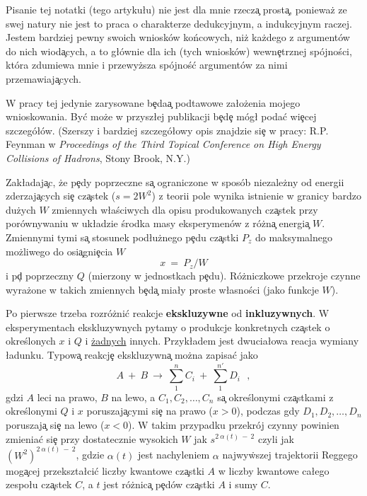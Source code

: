Pisanie tej notatki (tego artyku\l u) nie jest dla mnie rzecz\c{a} prost\c{a}, poniewa\.{z}
ze swej natury nie jest to praca o charakterze dedukcyjnym, a indukcyjnym raczej.
Jestem bardziej pewny swoich wniosk\'{o}w ko\'{n}cowych, ni\.{z} ka\.{z}dego z
argument\'{o}w do nich wiod\c{a}cych, a to g\l \'{o}wnie dla ich (tych wniosk\'{o}w)
wewn\c{e}trznej sp\'{o}jno\'{s}ci, kt\'{o}ra zdumiewa mnie i przewy\.{z}sza
sp\'{o}jno\'{s}\'{c} argument\'{o}w za nimi przemawiaj\c{a}cych.

W pracy tej jedynie zarysowane b\c{e}da\c{a} podtawowe za\l o\.{z}enia mojego
wnioskowania. By\'{c} mo\.{z}e w przysz\l ej publikacji b\c{e}d\c{e} m\'{o}g{\l }
poda\'{c} wi\c{e}cej szczeg\'{o}\l \'{o}w. (Szerszy i bardziej szczeg\'{o}\l owy
opis znajdzie si\c{e} w pracy: R.P. Feynman w {\it Proceedings of the Third
Topical Conference on High Energy Collisions of Hadrons},
Stony Brook, N.Y.)

Zak\l adaj\c{a}c, \.{z}e p\c{e}dy poprzeczne s\c{a} ograniczone w spos\'{o}b
niezale\.{z}ny od energii zderzaj\c{a}cych si\c{e} cz\c{a}stek ($s=2W^2$)
z teorii pole wynika istnienie w granicy bardzo du\.{z}ych $W$ zmiennych w\l a\'{s}ciwych
dla opisu produkowanych cz\c{a}stek przy por\'{o}wnywaniu w uk\l adzie
\'{s}rodka masy
eksperymen\'{o}w z r\'{o}\.{z}n\c{a} energi\c{a} $W$.
Zmiennymi tymi s\c{a} stosunek pod\l u\.{z}nego p\c{e}du cz\c{a}stki $P_z$ do maksymalnego
mo\.{z}liwego do osi\c{a}gni\c{e}cia $W$
$$
x~=~P_z/W
$$
i p\c{d} poprzeczny $Q$ (mierzony w jednostkach p\c{e}du).
R\'{o}\.{z}niczkowe przekroje czynne wyra\.{z}one w takich zmiennych b\c{e}d\c{a}
mia\l y proste w\l asno\'{s}ci (jako funkcje $W$).

Po pierwsze trzeba rozr\'{o}\.{z}ni\'{c} reakcje {\bf ekskluzywne} od {\bf
inkluzywnych}. W eksperymentach ekskluzywnych pytamy o produkcje konkretnych cz\c{a}stek
o okre\'{s}lonych $x$ i $Q$ i \underline {\.{z}adnych} innych. Przyk\l adem jest
dwucia\l owa reacja wymiany \l adunku. Typow\c{a} reakcj\c{e} ekskluzywn\c{a}
mo\.{z}na zapisa\'{c} jako
$$
A~+~B~\rightarrow~\sum \limits_{1}^{n} C_i~+~\sum \limits_{1}^{n'} D_i~~~,
$$
gdzi $A$ leci na prawo, $B$ na lewo, a $C_1, C_2,\ldots,C_n$ s\c{a} okre\'{s}lonymi
cz\c{a}stkami z okre\'{s}lonymi $Q$ i $x$ poruszaj\c{a}cymi si\c{e} na prawo ($x>0$),
podczas gdy $D_1, D_2,\ldots,D_n$ poruszaj\c{a} si\c{e} na lewo ($x<0$).
W takim przypadku przekr\'{o}j czynny powinien zmienia\'{c} si\c{e} przy dostatecznie
wysokich $W$ jak
\mbox{$
s^{2 \:\alpha(t)\:-\:2}
$}
czyli jak $
\left(W^2\right)^{2 \:\alpha(t)\:-\:2}
$, gdzie $\alpha(t)$ jest nachyleniem $\alpha$ najwy\.{w}szej trajektorii Reggego
mog\c{a}cej przekszta\l ci\'{c} liczby kwantowe cz\c{a}stki $A$ w liczby kwantowe ca\l ego
zespo\l u cz\c{a}stek $C$, a $t$ jest r\'{o}\.{z}nic\c{a} p\c{e}d\'{o}w cz\c{a}stki $A$
i sumy $C$.

